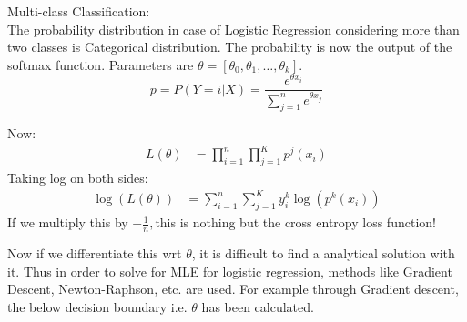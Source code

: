 \documentclass{beamer}
\begin{document}
\begin{frame}







Multi-class Classification:\\
The probability distribution in case of Logistic Regression considering more than two classes is Categorical distribution. The probability is now the output of the softmax function.
Parameters are $\theta=[\theta_0,\theta_1,\ldots, \theta_k]$.
\begin{equation}
p = P(Y=i|X) = \frac{e^{\theta x_i}}{\sum_{j=1}^ne^{\theta x_j}}
\end{equation}


\end{frame}
\begin{frame}
Now:
\begin{align*}
    L(\theta)&= \prod_{i=1}^n\prod_{j=1}^K p^j(x_i)
\end{align*}
Taking log on both sides:\\
\begin{align*}
    \log(L(\theta)) &= \sum_{i=1}^n\sum_{j=1}^K y_i^k\log(p^k(x_i))
\end{align*}
If we multiply this by $-\frac{1}{n},$this is nothing but the cross entropy loss function!



\end{frame}
\begin{frame}
    Now if we differentiate this wrt $\theta$, it is difficult to find a analytical solution with it.
    Thus in order to solve for MLE for logistic regression, methods like Gradient Descent, Newton-Raphson, etc. are used. For example through Gradient descent, the below decision boundary i.e. $\theta$ has been calculated.
    
\end{frame}
\end{document}
